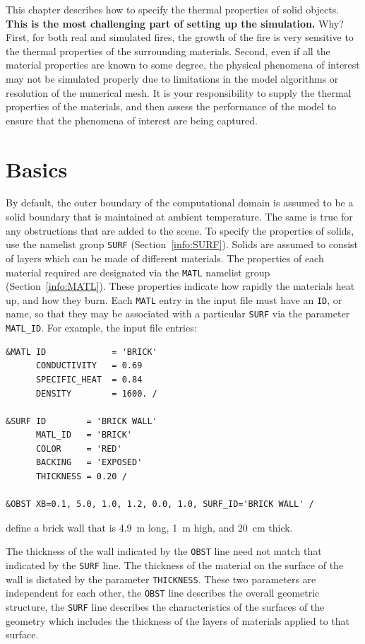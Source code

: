 \documentclass[11pt]{book}
\newcommand{\ct}{\tt\small}
\begin{document}
This chapter describes how to specify the thermal properties of solid objects. {\bf This is
the most challenging part of setting up the simulation.} Why?  First,
for both real and simulated fires, the growth of the fire is very
sensitive to the thermal properties of the surrounding
materials. Second, even if all the material properties are known to
some degree, the physical phenomena of interest may not be simulated
properly due to limitations in the model algorithms or resolution of
the numerical mesh. It is your responsibility to supply the thermal
properties of the materials, and then assess the performance of the
model to ensure that the phenomena of interest are being captured.


\section{Basics}
\label{info:SURF_MATL_Basics}

By default, the outer boundary of the computational domain is assumed
to be a solid boundary that is maintained at ambient temperature. The
same is true for any obstructions that are added to the scene. To
specify the properties of solids, use the namelist group {\ct SURF}
(Section~\ref{info:SURF}). Solids are assumed to
consist of layers which can be made of different materials.  The
properties of each material required are designated via the {\ct MATL}
namelist group (Section~\ref{info:MATL}).  These properties indicate how
rapidly the materials heat up, and how they burn.  Each {\ct MATL}
entry in the input file must have an {\ct ID}, or name, so that they
may be associated with a particular {\ct SURF} via the parameter {\ct
MATL\_ID}.  For example, the input file entries:

\footnotesize
\begin{verbatim}
&MATL ID             = 'BRICK'
      CONDUCTIVITY   = 0.69
      SPECIFIC_HEAT  = 0.84
      DENSITY        = 1600. /

&SURF ID        = 'BRICK WALL'
      MATL_ID   = 'BRICK'
      COLOR     = 'RED'
      BACKING   = 'EXPOSED'
      THICKNESS = 0.20 /

&OBST XB=0.1, 5.0, 1.0, 1.2, 0.0, 1.0, SURF_ID='BRICK WALL' /
\end{verbatim}
\normalsize

\noindent
define a brick wall that is 4.9~m long, 1~m high, and 20~cm thick.
\begin{warning}
\noindent
The thickness of the wall indicated by the {\ct OBST} line need not
match that indicated by the {\ct SURF} line. The thickness of the material on the surface of the wall
is dictated by the parameter {\ct THICKNESS}.  These two parameters are independent for each other,
the {\ct OBST} line describes the overall geometric structure, the {\ct SURF} line describes the
characteristics of the surfaces of the geometry which includes the thickness of the layers of
materials applied to that surface.
\end{warning}
\end{document}
